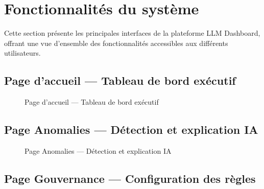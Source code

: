 \section{Fonctionnalités du système}
\label{sec:s3_features}

Cette section présente les principales interfaces de la plateforme LLM Dashboard, offrant une vue d'ensemble des fonctionnalités accessibles aux différents utilisateurs.

\subsection{Page d'accueil --- Tableau de bord exécutif}

\begin{figure}[H]
    \centering
    \caption{Page d'accueil --- Tableau de bord exécutif}
    \label{fig:feat_dashboard}
\end{figure}

\subsection{Page Anomalies --- Détection et explication IA}

\begin{figure}[H]
    \centering
    \caption{Page Anomalies --- Détection et explication IA}
    \label{fig:feat_anomalies}
\end{figure}

\subsection{Page Gouvernance --- Configuration des règles}

